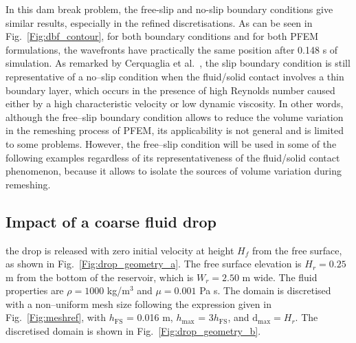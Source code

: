 \documentclass[final,3p,times]{elsarticle}
\newcommand{\EF}[1]{{\color{black}{#1}}}
\begin{document}
In this dam break problem, the free-slip and no-slip boundary conditions give similar results, especially in the refined discretisations. As can be seen in Fig.~\ref{Fig:dbf_contour}, for both boundary conditions and for both PFEM formulations, the wavefronts have practically the same position after 0.148 s of simulation. As remarked by Cerquaglia et al.~\citep{cerquaglia2017free}, the slip boundary condition is still representative of a no--slip condition when the fluid/solid contact involves a thin boundary layer, which occurs in the presence of high Reynolds number caused either by a high characteristic velocity or low dynamic viscosity. In other words, although the free--slip boundary condition allows to reduce the volume variation in the remeshing process of PFEM, its applicability is not general and is limited to some problems. However, the free--slip condition will be used in some of the following examples regardless of its representativeness of the fluid/solid contact phenomenon, because it allows to isolate the sources of volume variation during remeshing. 




\subsection{Impact of a coarse fluid drop}

\EF{
This problem consists of simulating the fall and impact of a drop of water in PFEM. The idea is to analyse the influence on the mass and energy variations when a drop is discretised by a single element in PFEM--AS and PFEM--LS. It can be assumed that the drop originates from splashing, i.e.~it may represent an element or a particle that is detached from the free surface. For simplicity, in this work} the drop is released with zero initial velocity at height $H_f$ from the free surface, as shown in Fig.~\ref{Fig:drop_geometry_a}. The free surface elevation is $H_r=0.25$ m from the bottom of the reservoir, which is $W_r=2.50$ m wide. The fluid properties are $\rho = 1000$ kg/m$^3$ and $\mu = 0.001$ Pa s. The domain is discretised with a non--uniform mesh size following the expression given in Fig.~\ref{Fig:meshref}, with $h_\mathrm{FS}$ = 0.016 m, $h_\mathrm{max}$ = 3$h_\mathrm{FS}$, and $\mathrm{d}_\mathrm{max} = H_r$. The discretised domain is shown in Fig.~\ref{Fig:drop_geometry_b}. 
\end{document}
